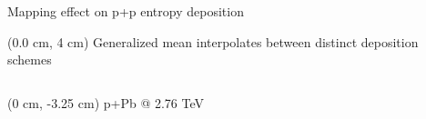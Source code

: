 \documentclass[svgnames]{beamer}
\begin{document}
\begin{frame}[label=ppoverlap]{Mapping effect on p+p entropy deposition}
\begin{textblock*}{\linewidth}
  \end{textblock*}

  \begin{textblock*}{\linewidth}(0.0 cm, 4 cm)
    \centering Generalized mean interpolates between distinct deposition schemes
  \end{textblock*}
 
\end{frame}


\newcommand{\meanmarker}[1]{#1}
\newcommand{\pPb}[1]{#1}
\newcommand{\dAu}[1]{#1}

\begin{frame}[label=pvariation]

\begin{columns}[T]
 
 \begin{column}{0.5\textwidth}
 
  \begin{textblock*}{\linewidth}(0 cm, -3.25 cm)
    \centering p+Pb @ 2.76 TeV
  \end{textblock*}
 

\end{column}
\end{columns}
\end{frame}
\end{document}
